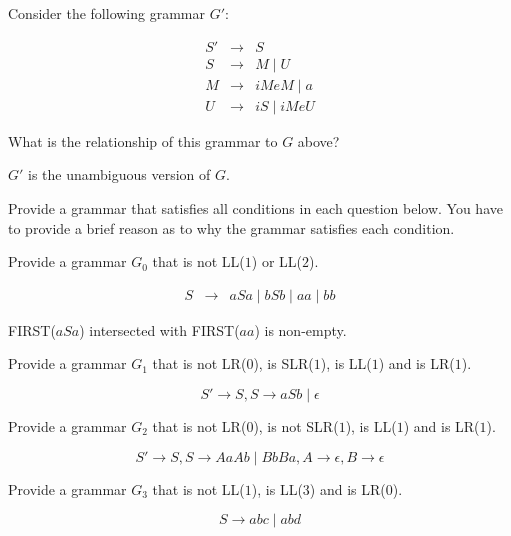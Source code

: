 \documentclass[12pt]{article}
\begin{document}
\begin{exe}
\begin{xlist}
{\ex Consider the following grammar $G'$:

\setcounter{equation}{0}
\begin{eqnarray}
S' & \rightarrow & S \nonumber \\
S  & \rightarrow & M \mid U \nonumber \\
M  & \rightarrow & iMeM \mid a \nonumber \\
U  & \rightarrow & iS \mid iMeU \nonumber
\end{eqnarray}

What is the relationship of this grammar to $G$ above?

\begin{soln} $G'$ is the unambiguous version of $G$. \end{soln}
}

\end{xlist}

\newpage

\ex\label{givegram} Provide a grammar that satisfies all
conditions in each question below. You have to provide a brief reason
as to why the grammar satisfies each condition.

\begin{xlist}

{\ex Provide a grammar $G_0$ that is not LL($1$) or LL($2$).

\begin{soln} 
\begin{eqnarray}
S & \rightarrow & aSa \mid bSb \mid aa \mid bb \nonumber
\end{eqnarray}

FIRST($aSa$) intersected with FIRST($aa$) is non-empty. 
\end{soln}
}

{\ex Provide a grammar $G_1$ that is not LR($0$), is SLR($1$), is LL($1$) and is LR($1$).
\begin{soln}
\[ S' \rightarrow S , S \rightarrow a S b \mid \epsilon \]
\end{soln}
}


{\ex Provide a grammar $G_2$ that is not LR($0$), is not SLR($1$), is LL($1$) and is LR($1$).
\begin{soln}
\[ S' \rightarrow S , S \rightarrow A a A b \mid B b B a , A \rightarrow \epsilon , B \rightarrow \epsilon \]
\end{soln}
}

{\ex Provide a grammar $G_3$ that is not LL($1$), is LL($3$) and is LR($0$).
\begin{soln}
\[ S \rightarrow a b c \mid a b d \]
\end{soln}
}


\end{xlist}
\end{exe}
\end{document}

